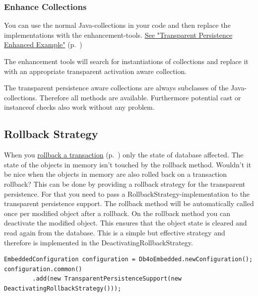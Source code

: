 \subsubsection{Enhance Collections}
\label{ref:basics-transparentpersistence-collections-enhance-collections}

You can use the normal Java-collections in your code and then replace the implementations with the enhancement-tools. \hyperref[ref:basics-transparentpersistence-ta-enhanced-example]{See "Transparent Persistence Enhanced Example"} (p.~\pageref{ref:basics-transparentpersistence-ta-enhanced-example})

The enhancement tools will search for instantiations of collections and replace it with an appropriate transparent activation aware collection.

The transparent persistence aware collections are always subclasses of the Java-collections. Therefore all methods are available. Furthermore potential cast or instanceof checks also work without any problem.

\subsection{Rollback Strategy}
\label{ref:basics-transparentpersistence-automatic-deactivation}

When you \hyperref[ref:basics-acid-and-transactions]{rollback a transaction} (p.~\pageref{ref:basics-acid-and-transactions}) only the state of database affected. The state of the objects in memory isn't touched by the rollback method. Wouldn't it be nice when the objects in memory are also rolled back on a transaction rollback? This can be done by providing a rollback strategy for the transparent persistence. For that you need to pass a RollbackStrategy-implementation to the transparent persistence support. The rollback method will be automatically called once per modified object after a rollback. On the rollback method you can deactivate the modified object. This ensures that the object state is cleared and read again from the database. This is a simple but effective strategy and therefore is implemented in the DeactivatingRollbackStrategy.

\begin{lstlisting}
EmbeddedConfiguration configuration = Db4oEmbedded.newConfiguration();
configuration.common()
        .add(new TransparentPersistenceSupport(new DeactivatingRollbackStrategy()));
\end{lstlisting}

